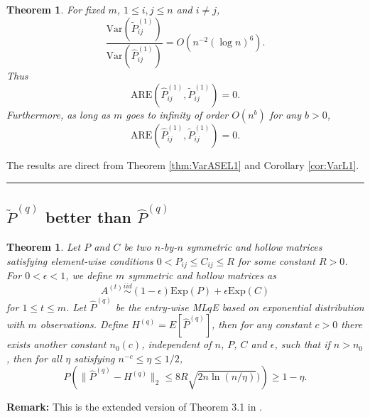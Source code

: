 \documentclass[a4paper]{article}
\newenvironment{proof}{{\bf Proof:  }}{\hfill\rule{2mm}{2mm}}
\newtheorem{theorem}[fact]{Theorem}
\begin{document}
\begin{theorem}
\label{thm:AREL1}
For fixed $m$, $1 \le i, j \le n$ and $i \ne j$,
\[
	\frac{\mathrm{Var}(\widetilde{P}_{ij}^{(1)})}{\mathrm{Var}(\hat{P}_{ij}^{(1)})}
    = O(n^{-2} (\log n)^6).
\]
Thus
\[
	\mathrm{ARE}(\hat{P}_{ij}^{(1)}, \widetilde{P}_{ij}^{(1)}) = 0.
\]
Furthermore, as long as $m$ goes to infinity of order $O(n^b)$ for any $b > 0$,
\[
	\mathrm{ARE}(\hat{P}_{ij}^{(1)}, \widetilde{P}_{ij}^{(1)}) = 0.
\]
\end{theorem}
\begin{proof}
The results are direct from Theorem \ref{thm:VarASEL1} and Corollary \ref{cor:VarL1}.
\end{proof}



\subsection{$\widetilde{P}^{(q)}$ better than $\hat{P}^{(q)}$}


\begin{theorem}
\label{thm:PqDiff}
Let $P$ and $C$ be two $n$-by-$n$ symmetric and hollow matrices satisfying element-wise conditions $0 < P_{ij} \le C_{ij} \le R$ for some constant $R > 0$. For $0 < \epsilon < 1$, we define $m$ symmetric and hollow matrices as
\[
	A^{(t)} \stackrel{iid}{\sim} (1-\epsilon) \mathrm{Exp}(P) + \epsilon \mathrm{Exp}(C)
\]
for $1 \le t \le m$.
Let $\hat{P}^{(q)}$ be the entry-wise ML$q$E based on exponential distribution with $m$ observations.
Define $H^{(q)} = E[\hat{P}^{(q)}]$,
then for any constant $c > 0$ there exists another constant $n_0(c)$, independent of $n$, $P$, $C$ and $\epsilon$, such that if $n > n_0$, then for all $\eta$ satisfying $n^{-c} \le \eta \le 1/2$,
\[
	P \left( \| \hat{P}^{(q)} - H^{(q)} \|_2 \le 8 R \sqrt{2 n \ln(n/\eta)}) \right) \ge 1 - \eta.
\]
\end{theorem}
\textbf{Remark:} This is the extended version of Theorem 3.1 in \cite{oliveira2009concentration}.
\end{document}
